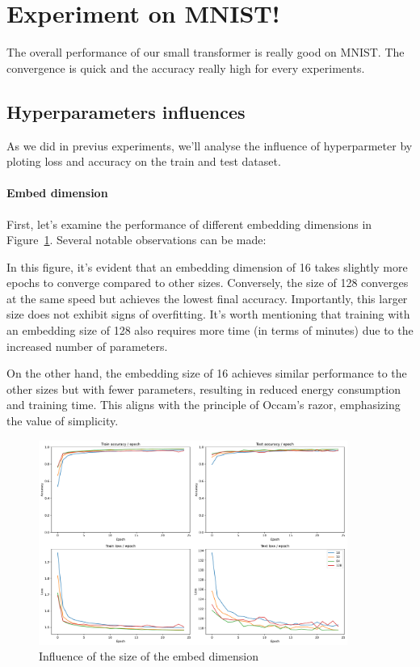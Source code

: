 \section{Experiment on MNIST!}
The overall performance of our small transformer is really good on MNIST. The convergence is quick and the accuracy really high for every experiments.

\subsection{Hyperparameters influences}
As we did in previus experiments, we'll analyse the influence of hyperparmeter by ploting loss and accuracy on the train and test dataset.

\paragraph{Embed dimension}
First, let's examine the performance of different embedding dimensions in Figure~\ref{fig:embed_dim_influence}. Several notable observations can be made:

In this figure, it's evident that an embedding dimension of 16 takes slightly more epochs to converge compared to other sizes. Conversely, the size of 128 converges at the same speed but achieves the lowest final accuracy. Importantly, this larger size does not exhibit signs of overfitting. It's worth mentioning that training with an embedding size of 128 also requires more time (in terms of minutes) due to the increased number of parameters.

On the other hand, the embedding size of 16 achieves similar performance to the other sizes but with fewer parameters, resulting in reduced energy consumption and training time. This aligns with the principle of Occam's razor, emphasizing the value of simplicity.

\begin{figure}[H]
    \centering
    \includegraphics*[width=0.9\textwidth]{figs/Transformers/embed_dim_influence_25.pdf}
    \caption{Influence of the size of the embed dimension}
    \label{fig:embed_dim_influence}
\end{figure}

